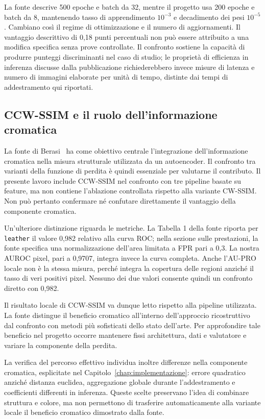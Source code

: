 La fonte descrive 500 epoche e batch da 32, mentre il progetto usa 200 epoche e batch da 8, mantenendo tasso di apprendimento $10^{-3}$ e decadimento dei pesi $10^{-5}$. Cambiano così il regime di ottimizzazione e il numero di aggiornamenti. Il vantaggio descrittivo di 0,18 punti percentuali non può essere attribuito a una modifica specifica senza prove controllate. Il confronto sostiene la capacità di produrre punteggi discriminanti nel caso di studio; le proprietà di efficienza in inferenza discusse dalla pubblicazione richiederebbero invece misure di latenza e numero di immagini elaborate per unità di tempo, distinte dai tempi di addestramento qui riportati.

\subsection{CCW-SSIM e il ruolo dell'informazione cromatica}

La fonte di Berasi~\cite{Berasi_2023} ha come obiettivo centrale l'integrazione dell'informazione cromatica nella misura strutturale utilizzata da un autoencoder. Il confronto tra varianti della funzione di perdita è quindi essenziale per valutarne il contributo. Il presente lavoro include CCW-SSIM nel confronto con tre pipeline basate su feature, ma non contiene l'ablazione controllata rispetto alla variante CW-SSIM. Non può pertanto confermare né confutare direttamente il vantaggio della componente cromatica.

Un'ulteriore distinzione riguarda le metriche. La Tabella 1 della fonte riporta per \texttt{leather} il valore 0,982 relativo alla curva ROC; nella sezione sulle prestazioni, la fonte specifica una normalizzazione dell'area limitata a FPR pari a 0,3. La nostra AUROC pixel, pari a 0,9707, integra invece la curva completa. Anche l'AU-PRO locale non è la stessa misura, perché integra la copertura delle regioni anziché il tasso di veri positivi pixel. Nessuno dei due valori consente quindi un confronto diretto con 0,982.

Il risultato locale di CCW-SSIM va dunque letto rispetto alla pipeline utilizzata. La fonte distingue il beneficio cromatico all'interno dell'approccio ricostruttivo dal confronto con metodi più sofisticati dello stato dell'arte. Per approfondire tale beneficio nel progetto occorre mantenere fissi architettura, dati e valutatore e variare la componente della perdita.

La verifica del percorso effettivo individua inoltre differenze nella componente cromatica, esplicitate nel Capitolo~\ref{chap:implementazione}: errore quadratico anziché distanza euclidea, aggregazione globale durante l'addestramento e coefficienti differenti in inferenza. Queste scelte preservano l'idea di combinare struttura e colore, ma non permettono di trasferire automaticamente alla variante locale il beneficio cromatico dimostrato dalla fonte.

